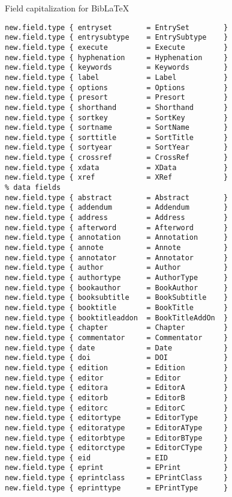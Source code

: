 \documentclass[11pt,a4paper]{scrbook}
\makeatletter
\newcommand\bibLaTeX{Bib\-\LaTeX\index{biblatex@Bib\-\LaTeX}}
\makeatother
\begin{document}
Field capitalization for \bibLaTeX{}

\begin{lstlisting}[language=BibTool]
% special fields
new.field.type { entryset        = EntrySet        }
new.field.type { entrysubtype    = EntrySubtype    }
new.field.type { execute         = Execute         }
new.field.type { hyphenation     = Hyphenation     }
new.field.type { keywords        = Keywords        }
new.field.type { label           = Label           }
new.field.type { options         = Options         }
new.field.type { presort         = Presort         }
new.field.type { shorthand       = Shorthand       }
new.field.type { sortkey         = SortKey         }
new.field.type { sortname        = SortName        }
new.field.type { sorttitle       = SortTitle       }
new.field.type { sortyear        = SortYear        }
new.field.type { crossref        = CrossRef        }
new.field.type { xdata           = XData           }
new.field.type { xref            = XRef            }
% data fields
new.field.type { abstract        = Abstract        }
new.field.type { addendum        = Addendum        }
new.field.type { address         = Address         }
new.field.type { afterword       = Afterword       }
new.field.type { annotation      = Annotation      }
new.field.type { annote          = Annote          }
new.field.type { annotator       = Annotator       }
new.field.type { author          = Author          }
new.field.type { authortype      = AuthorType      }
new.field.type { bookauthor      = BookAuthor      }
new.field.type { booksubtitle    = BookSubtitle    }
new.field.type { booktitle       = BookTitle       }
new.field.type { booktitleaddon  = BookTitleAddOn  }
new.field.type { chapter         = Chapter         }
new.field.type { commentator     = Commentator     }
new.field.type { date            = Date            }
new.field.type { doi             = DOI             }
new.field.type { edition         = Edition         }
new.field.type { editor          = Editor          }
new.field.type { editora         = EditorA         }
new.field.type { editorb         = EditorB         }
new.field.type { editorc         = EditorC         }
new.field.type { editortype      = EditorType      }
new.field.type { editoratype     = EditorAType     }
new.field.type { editorbtype     = EditorBType     }
new.field.type { editorctype     = EditorCType     }
new.field.type { eid             = EID             }
new.field.type { eprint          = EPrint          }
new.field.type { eprintclass     = EPrintClass     }
new.field.type { eprinttype      = EPrintType      }

\end{lstlisting}
\end{document}
